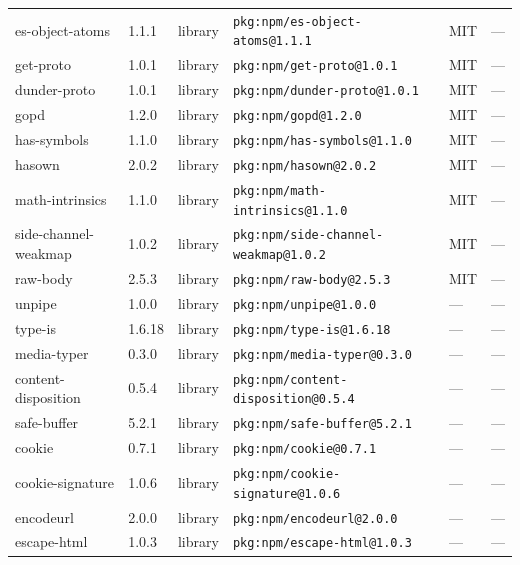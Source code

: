 \documentclass[11pt,a4paper]{article}
\begin{document}
\begin{longtable}{|p{4cm}|p{2cm}|p{1.6cm}|p{5cm}|p{1.5cm}|p{3.5cm}|}
\raggedright es-object-atoms & 1.1.1 & library & \small\texttt{pkg:npm/es-object-atoms@1.1.1} & MIT & \small — \\
\raggedright get-proto & 1.0.1 & library & \small\texttt{pkg:npm/get-proto@1.0.1} & MIT & \small — \\
\raggedright dunder-proto & 1.0.1 & library & \small\texttt{pkg:npm/dunder-proto@1.0.1} & MIT & \small — \\
\raggedright gopd & 1.2.0 & library & \small\texttt{pkg:npm/gopd@1.2.0} & MIT & \small — \\
\raggedright has-symbols & 1.1.0 & library & \small\texttt{pkg:npm/has-symbols@1.1.0} & MIT & \small — \\
\raggedright hasown & 2.0.2 & library & \small\texttt{pkg:npm/hasown@2.0.2} & MIT & \small — \\
\raggedright math-intrinsics & 1.1.0 & library & \small\texttt{pkg:npm/math-intrinsics@1.1.0} & MIT & \small — \\
\raggedright side-channel-weakmap & 1.0.2 & library & \small\texttt{pkg:npm/side-channel-weakmap@1.0.2} & MIT & \small — \\
\raggedright raw-body & 2.5.3 & library & \small\texttt{pkg:npm/raw-body@2.5.3} & MIT & \small — \\
\raggedright unpipe & 1.0.0 & library & \small\texttt{pkg:npm/unpipe@1.0.0} & — & \small — \\
\raggedright type-is & 1.6.18 & library & \small\texttt{pkg:npm/type-is@1.6.18} & — & \small — \\
\raggedright media-typer & 0.3.0 & library & \small\texttt{pkg:npm/media-typer@0.3.0} & — & \small — \\
\raggedright content-disposition & 0.5.4 & library & \small\texttt{pkg:npm/content-disposition@0.5.4} & — & \small — \\
\raggedright safe-buffer & 5.2.1 & library & \small\texttt{pkg:npm/safe-buffer@5.2.1} & — & \small — \\
\raggedright cookie & 0.7.1 & library & \small\texttt{pkg:npm/cookie@0.7.1} & — & \small — \\
\raggedright cookie-signature & 1.0.6 & library & \small\texttt{pkg:npm/cookie-signature@1.0.6} & — & \small — \\
\raggedright encodeurl & 2.0.0 & library & \small\texttt{pkg:npm/encodeurl@2.0.0} & — & \small — \\
\raggedright escape-html & 1.0.3 & library & \small\texttt{pkg:npm/escape-html@1.0.3} & — & \small — \\

\end{longtable}
\end{document}

